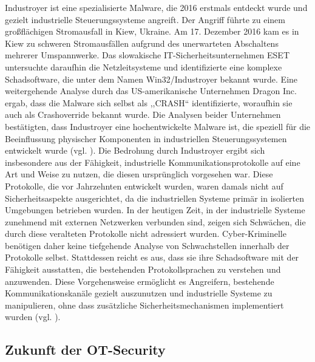 Industroyer ist eine spezialisierte Malware, die 2016 erstmals entdeckt wurde und gezielt industrielle Steuerungssysteme angreift. Der Angriff führte zu einem großflächigen Stromausfall in Kiew, Ukraine. Am 17. Dezember 2016 kam es in Kiew zu schweren Stromausfällen aufgrund des unerwarteten Abschaltens mehrerer Umspannwerke. Das slowakische IT-Sicherheitsunternehmen ESET untersuchte daraufhin die Netzleitsysteme und identifizierte eine komplexe Schadsoftware, die unter dem Namen Win32/Industroyer bekannt wurde. Eine weitergehende Analyse durch das US-amerikanische Unternehmen Dragon Inc. ergab, dass die Malware sich selbst als ,,CRASH`` identifizierte, woraufhin sie auch als Crashoverride bekannt wurde. Die Analysen beider Unternehmen bestätigten, dass Industroyer eine hochentwickelte Malware ist, die speziell für die Beeinflussung physischer Komponenten in industriellen Steuerungssystemen entwickelt wurde (vgl. \cite{rhebo}). Die Bedrohung durch Industroyer ergibt sich insbesondere aus der Fähigkeit, industrielle Kommunikationsprotokolle auf eine Art und Weise zu nutzen, die diesen ursprünglich vorgesehen war. Diese Protokolle, die vor Jahrzehnten entwickelt wurden, waren damals nicht auf Sicherheitsaspekte ausgerichtet, da die industriellen Systeme primär in isolierten Umgebungen betrieben wurden. In der heutigen Zeit, in der industrielle Systeme zunehmend mit externen Netzwerken verbunden sind, zeigen sich Schwächen, die durch diese veralteten Protokolle nicht adressiert wurden. Cyber-Kriminelle benötigen daher keine tiefgehende Analyse von Schwachstellen innerhalb der Protokolle selbst. \clearpage \noindent Stattdessen reicht es aus, dass sie ihre Schadsoftware mit der Fähigkeit ausstatten, die bestehenden Protokollsprachen zu verstehen und anzuwenden. Diese Vorgehensweise ermöglicht es Angreifern, bestehende Kommunikationskanäle gezielt auszunutzen und industrielle Systeme zu manipulieren, ohne dass zusätzliche Sicherheitsmechanismen implementiert wurden (vgl. \cite{welivesecurity}). 

\subsection{Zukunft der OT-Security}

